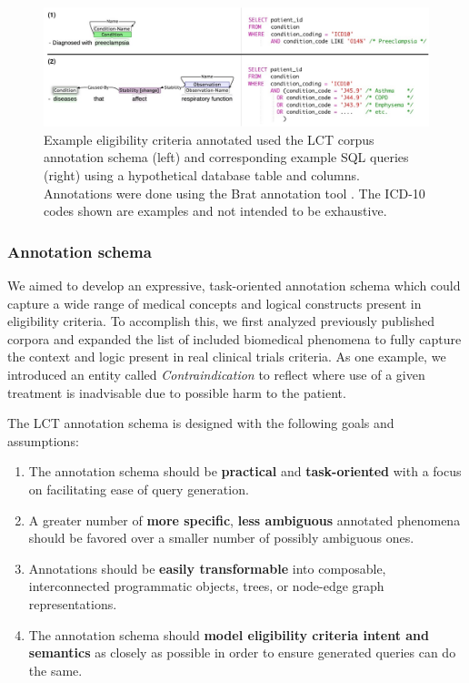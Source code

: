 \documentclass[../main.tex]{subfiles}
\begin{document}
\begin{figure}[h!]
  \includegraphics[scale=0.57]{Figures/Aim1/aim1_lct_text2sql.pdf}  
  \caption{Example eligibility criteria annotated used the LCT corpus annotation schema (left) and corresponding example SQL queries (right) using a hypothetical database table and columns. Annotations were done using the Brat annotation tool \cite{stenetorp2012brat}. The ICD-10 codes shown are examples and not intended to be exhaustive.}
  \label{aim1_fig_lct_text2sql}
\end{figure}

\subsubsection{Annotation schema}

We aimed to develop an expressive, task-oriented annotation schema which could capture a wide range of medical concepts and logical constructs present in eligibility criteria. To accomplish this, we first analyzed previously published corpora \cite{weng2011elixr,boland2012elixrtime,kang2017eliie,kury2020chia} and expanded the list of included biomedical phenomena to fully capture the context and logic present in real clinical trials criteria. As one example, we introduced an entity called \textit{Contraindication} to reflect where use of a given treatment is inadvisable due to possible harm to the patient. 

The LCT annotation schema is designed with the following goals and assumptions:

\begin{enumerate}
    \item The annotation schema should be \textbf{practical} and  \textbf{task-oriented} with a focus on facilitating ease of query generation. 
    \item A greater number of \textbf{more specific}, \textbf{less ambiguous} annotated phenomena should be favored over a smaller number of possibly ambiguous ones.
    \item Annotations should be \textbf{easily transformable} into composable, interconnected programmatic objects, trees, or node-edge graph representations.
    \item The annotation schema should \textbf{model eligibility criteria intent and semantics} as closely as possible in order to ensure generated queries can do the same.
\end{enumerate}
\end{document}

